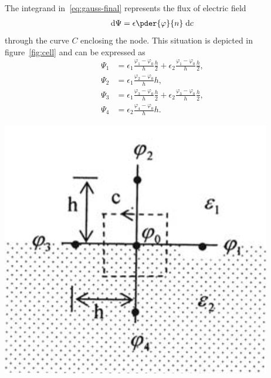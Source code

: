 \documentclass[11pt,a4paper]{article}
\begin{document}
\noindent%
\begin{minipage}{.6\textwidth}
    The integrand in~\ref{eq:gauss-final} represents the flux of electric field
    \begin{align*}
        \mathrm d \Psi = \epsilon \pder{\varphi}{n} \; \mathrm d c
    \end{align*}
    through the curve $C$ enclosing the node. This situation is depicted in figure~\ref{fig:cell} and can be expressed as
    \begin{align*}
        \Psi_1 &= \epsilon_1 \frac{\varphi_1-\varphi_0}{h} \frac h2 + \epsilon_2 \frac{\varphi_1-\varphi_0}{h} \frac h2,
    \\
        \Psi_2 &= \epsilon_1 \frac{\varphi_2-\varphi_0}{h} h,
    \\
        \Psi_3 &= \epsilon_1 \frac{\varphi_3-\varphi_0}{h} \frac h2 + \epsilon_2 \frac{\varphi_3-\varphi_0}{h} \frac h2,
    \\
        \Psi_4 &= \epsilon_2 \frac{\varphi_4-\varphi_0}{h} h.
    \end{align*}
\end{minipage}\hfill\begin{minipage}{.35\textwidth}
    \centering
    \captionsetup{type=figure}
    \includegraphics[width=\textwidth]{src/cell.png}
    \label{fig:cell}
\end{minipage}
\end{document}
